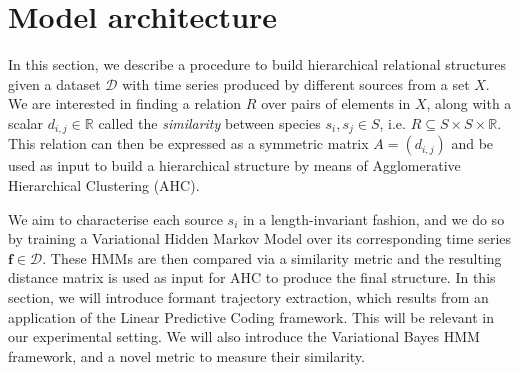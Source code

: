 \documentclass[pdftex,11pt,a4paper]{article}
\theoremstyle{definition}
\theoremstyle{remark}
\newcommand*{\V}[1]{\mathbf{#1}}%
\begin{document}
 

\section{Model architecture}
\label{section_model}
In this section, we describe a procedure to build hierarchical relational structures given a dataset $\mathcal{D}$ with time series produced by different sources from a set $X$. We are interested in finding a relation $R$ over pairs of elements in $X$, along with a scalar $d_{i, j} \in \mathbb{R}$ called the \emph{similarity} between species $s_i, s_j \in S$, i.e. $R \subseteq S \times S \times \mathbb{R}$. This relation can then be expressed as a symmetric matrix $A = (d_{i,j})$ and be used as input to build a hierarchical structure by means of Agglomerative Hierarchical Clustering (AHC). 
\par We aim to characterise each source $s_i$ in a length-invariant fashion, and we do so by training a Variational Hidden Markov Model over its corresponding time series $\V{f} \in \mathcal{D}$. These HMMs are then compared via a similarity metric and the resulting distance matrix is used as input for AHC to produce the final structure. In this section, we will introduce formant trajectory extraction, which results from an application of the Linear Predictive Coding framework. This will be relevant in our experimental setting. We will also introduce the Variational Bayes HMM framework, and a novel metric to measure their similarity.
\end{document}
